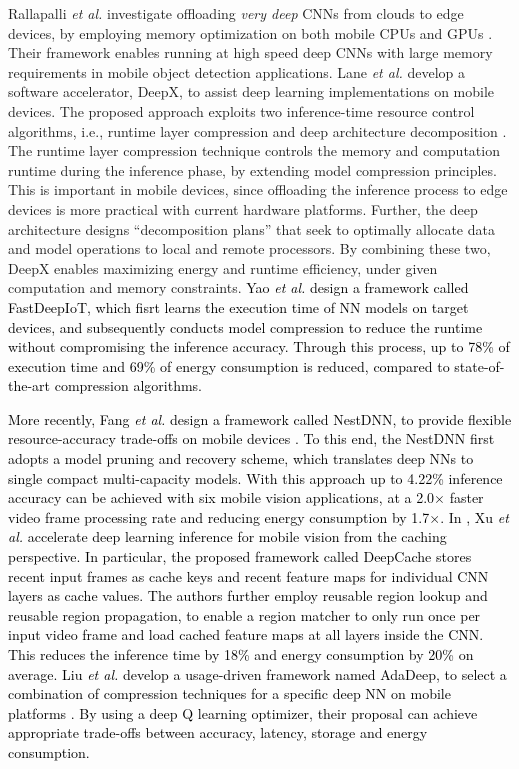 \documentclass[journal,comsoc,letter]{IEEEtran}
\newcommand{\rev}[1]{\textcolor{black}{#1}}
\begin{document}
Rallapalli \emph{et al.} investigate offloading \emph{very deep} CNNs from clouds to edge devices, by employing memory optimization on both mobile CPUs and GPUs \cite{rallapalli2016very}. Their framework enables running at high speed deep CNNs with large memory requirements in mobile object detection applications. Lane \emph{et al.} develop a software accelerator, DeepX, to assist deep learning implementations on mobile devices. The proposed approach exploits two inference-time resource control algorithms, i.e., runtime layer compression and deep architecture decomposition \cite{lane2016deepx}. The runtime layer compression technique controls the memory and computation runtime during the inference phase, by extending model compression principles. This is important in mobile devices, since offloading the inference process to edge devices is more practical with current hardware platforms. Further, the deep architecture designs ``decomposition plans'' that seek to optimally allocate data and model operations to local and remote processors. By combining these two, DeepX enables maximizing energy and runtime efficiency, under given computation and memory constraints. \rev{Yao \emph{et al.} \cite{yao2018fastdeepiot} design a framework called FastDeepIoT, which fisrt learns the execution time of NN models on target devices, and subsequently conducts model compression to reduce the runtime without compromising the inference accuracy. Through this process, up to
78\% of execution time and 69\% of energy consumption is reduced, compared to state-of-the-art compression algorithms.}

\rev{More recently, Fang \emph{et al.} design a framework called NestDNN, to provide flexible resource-accuracy trade-offs on mobile devices \cite{fang2018nestdnn}. To this end, the NestDNN first adopts a model pruning and recovery scheme, which  translates deep NNs to single compact multi-capacity models. With this approach up to 4.22\% inference accuracy can be achieved with six mobile vision applications, at a 2.0$\times$ faster video frame processing rate and reducing energy consumption by 1.7$\times$. In \cite{xu2018deepcache}, Xu \emph{et al.} accelerate deep learning inference for mobile vision from the caching perspective. In particular, the proposed framework called DeepCache stores recent input frames as cache keys and recent feature maps for individual CNN layers as cache values. The authors further employ reusable region lookup and reusable region propagation, to enable a region matcher to only run once per input video frame and load cached feature maps at all layers inside the CNN. This reduces the inference time by 18\% and energy consumption by 20\% on average. Liu \emph{et al.} develop a usage-driven framework named AdaDeep, to select a combination of compression techniques for a specific deep NN on mobile platforms \cite{liu2018ondemand}. By using a deep Q learning optimizer, their proposal can achieve appropriate trade-offs between accuracy, latency, storage and energy consumption.} 
\end{document}
